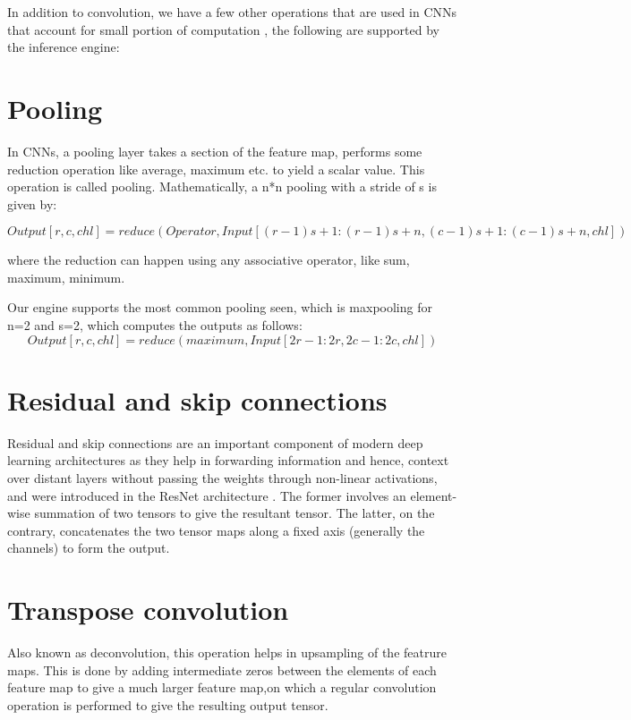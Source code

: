 \documentclass[a4paper,12pt, final]{report}
\begin{document}
In addition to convolution, we have a few other operations that are used in CNNs that account for small portion of computation , the following are supported by the inference engine:

\section{Pooling}

In CNNs, a pooling layer takes a section of the feature map, performs some reduction operation like average, maximum etc. to yield a scalar value. This operation is called pooling. Mathematically, a n*n pooling with a stride of s is given by:

\begin{equation*}
	Output[r,c,chl] = reduce(Operator,Input[(r-1)s+1:(r-1)s+n,(c-1)s+1:(c-1)s+n,chl])
\end{equation*}

where the reduction can happen using any associative operator, like sum, maximum, minimum.

Our engine supports the most common pooling seen, which is maxpooling for n=2 and s=2, which computes the outputs as follows:
\begin{equation*}
	Output[r,c,chl] = reduce(maximum,Input[2r-1:2r,2c-1:2c,chl])
\end{equation*}


\section{Residual and skip connections}

Residual and skip connections are an important component of modern deep learning architectures as they help in forwarding information and hence, context over distant layers without passing the weights through non-linear activations, and were introduced in the ResNet architecture \cite{ReNet}. The former involves an element-wise summation of two tensors to give the resultant tensor. The latter, on the contrary, concatenates the two tensor maps along a fixed axis (generally the channels) to form the output.

\section{Transpose convolution}

Also known as deconvolution, this operation helps in upsampling of the featrure maps. This is done by adding intermediate zeros between the elements of each feature map to give a much larger feature map,on which a regular convolution operation is performed to give the resulting output tensor.
\end{document}
